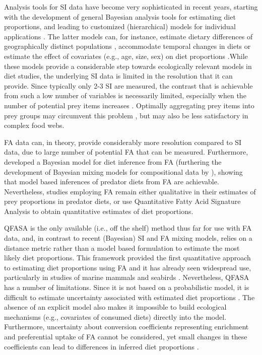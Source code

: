 \documentclass{article}%
\begin{document}
\begin{spacing}{1.9}
\begin{flushleft}
Analysis tools for SI data have become very sophisticated in recent
years, starting with the development of general Bayesian analysis
tools for estimating diet proportions, and leading to customized
(hierarchical) models for individual applications \citep{moore_incorporating_2008,hopkins_estimating_2012,parnell_bayesian_2012}. The latter models
can, for instance, estimate dietary differences of geographically
distinct populations \citep{semmens_quantifying_2009}, accommodate temporal
changes in diets or estimate the effect of covariates (e.g., age,
size, sex) on diet proportions \citep{parnell_bayesian_2012}.While these
models provide a considerable step towards ecologically relevant
models in diet studies, the underlying SI data is limited in the
resolution that it can provide. Since typically only 2-3 SI are
measured, the contrast that is achievable from such a low number of
variables is necessarily limited, especially when the number of
potential prey items increases \citep{phillips_source_2003,ward_quantitative_2011}. Optimally aggregating prey items into prey groups may
circumvent this problem \citep{ward_quantitative_2011}, but may also be less
satisfactory in complex food webs.

FA data can, in theory, provide considerably more resolution compared
to SI data, due to large number of potential FA that can be
measured. Furthermore, \citet{blanchard_inference_2011} developed a
Bayesian model for diet inference from FA (furthering the
development of Bayesian mixing models for compositional data by
\citet{billheimer_compositional_2001}), showing that model based
inferences of predator diets from FA are
achievable. Nevertheless, studies employing FA remain either qualitative
in their estimates of prey proportions in predator diets, or use
Quantitative Fatty Acid Signature Analysis \citep[QFASA; ][]{iverson_quantitative_2004} to
obtain quantitative estimates of diet proportions. 

QFASA is the only available (i.e., off the shelf) method thus far for use with FA data, and, in
contrast to recent (Bayesian) SI and FA mixing models, relies on a distance
metric rather than a model based formulation to estimate the most
likely diet proportions. This framework provided the first
quantitative approach to estimating diet proportions using FA
and it has already seen widespread use, particularly in studies of
marine mammals \citep{bowen_methods_2012} and seabirds
\citep{williams_using_2010}. Nevertheless, QFASA has a number of
limitations. Since it is not based on a probabilistic model, it is
difficult to estimate uncertainty associated with estimated diet
proportions \citep[but see Steward 2005 as cited in][]{blanchard_inference_2011}. The absence of an explicit model
also makes it impossible to build ecological mechanisms (e.g.,
covariates of consumed diets) directly into the model. Furthermore,
uncertainty about conversion coefficients representing enrichment and
preferential uptake of FA cannot be considered, yet small
changes in these coefficients can lead to differences in inferred diet
proportions \citep{wang_validating_2010}.


\end{flushleft}
\end{spacing}
\end{document}
